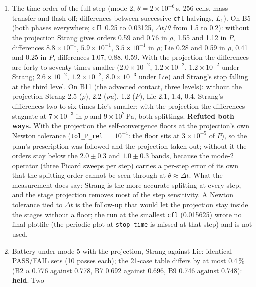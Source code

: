 \documentclass[11pt,a4paper]{article}
\newcommand{\code}[1]{\texttt{\small #1}}
\newcommand{\Dt}{\Delta t}
\begin{document}
\begin{enumerate}[nosep]
\item The time order of the full step (mode 2, $\theta = 2\times10^{-6}$\,s,
      256 cells, mass transfer and flash off; differences between
      successive \code{cfl} halvings, $L_1$).  On B5 (both phases
      everywhere; \code{cfl} 0.25 to 0.03125, $\Dt/\theta$ from 1.5 to
      0.2): without the projection Strang gives orders 0.59 and 0.76 in
      $\rho$, 1.55 and 1.12 in $P$, differences $8.8\times10^{-1}$,
      $5.9\times10^{-1}$, $3.5\times10^{-1}$ in $\rho$; Lie 0.28 and 0.59
      in $\rho$, 0.41 and 0.25 in $P$, differences 1.07, 0.88, 0.59.
      With the projection the differences are forty to seventy times
      smaller ($2.0\times10^{-2}$, $1.2\times10^{-2}$, $1.2\times10^{-2}$
      under Strang; $2.6\times10^{-2}$, $1.2\times10^{-2}$,
      $8.0\times10^{-3}$ under Lie) and Strang's stop falling at the
      third level.  On B11 (the advected contact, three levels): without
      the projection Strang 2.5 ($\rho$), 2.2 ($\rho u$), 1.2 ($P$),
      Lie 2.1, 1.4, 0.4, Strang's differences two to six times Lie's
      smaller; with the projection the differences stagnate at
      $7\times10^{-3}$ in $\rho$ and $9\times10^{2}$\,Pa, both
      splittings.  \textbf{Refuted both ways.}  With the projection the
      self-convergence floors at the projection's own Newton tolerance
      (\code{tol\_P\_rel} $=10^{-4}$: the floor sits at
      $3\times10^{-5}$ of $P$), so the plan's prescription was followed
      and the projection taken out; without it the orders stay below the
      $2.0\pm0.3$ and $1.0\pm0.3$ bands, because the mode-2 operator
      (three Picard sweeps per step) carries a per-step error of its own
      that the splitting order cannot be seen through at
      $\theta\approx\Dt$.  What the measurement does say: Strang is the
      more accurate splitting at every step, and the stage projection
      removes most of the step sensitivity.  A Newton tolerance tied to
      $\Dt$ is the follow-up that would let the projection stay inside
      the stages without a floor; the run at the smallest \code{cfl}
      (0.015625) wrote no final plotfile (the periodic plot at
      \code{stop\_time} is missed at that step) and is not used.
\item Battery under mode 5 with the projection, Strang against Lie:
      identical PASS/FAIL sets (10 passes each); the 21-case table
      differs by at most 0.4\,\% (B2 $u$ 0.776 against 0.778, B7 0.692
      against 0.696, B9 0.746 against 0.748): \textbf{held}.  Two

\end{enumerate}
\end{document}

